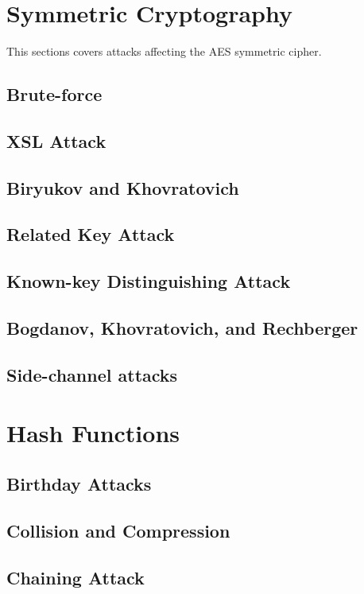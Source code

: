 \section{Symmetric Cryptography}

  This sections covers attacks affecting the AES symmetric cipher.

  \subsection{Brute-force}
  \subsection{XSL Attack}
  \subsection{Biryukov and Khovratovich}
  \subsection{Related Key Attack}
  \subsection{Known-key Distinguishing Attack}
  \subsection{Bogdanov, Khovratovich, and Rechberger}
  \subsection{Side-channel attacks}

\section{Hash Functions}

  \subsection{Birthday Attacks}
  \subsection{Collision and Compression}
  \subsection{Chaining Attack}

